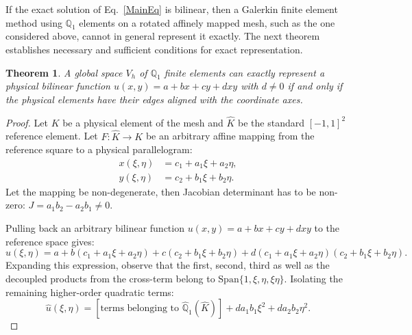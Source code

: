 \documentclass[a4paper]{article}
\theoremstyle{plain}
\newtheorem{theorem}[lemma]{Theorem}
\theoremstyle{definition}
\theoremstyle{remark}
\begin{document}
If the exact solution of Eq.~\eqref{MainEq} is bilinear, then a Galerkin finite element method using \(\mathbb Q_1\) elements on a rotated affinely mapped mesh, such as the one considered above, cannot in general represent it exactly. The next theorem establishes necessary and sufficient conditions for exact representation.

\begin{theorem}\label{thm:exactrep}
	A global space $V_h$ of $\mathbb{Q}_1$ finite elements can exactly represent a physical bilinear function $u(x,y) = a+ bx+ cy+  dxy$ with $d\neq 0$ if and only if the physical elements have their edges aligned with the coordinate axes.
\end{theorem}

\begin{proof}
Let $K$ be a physical element of the mesh and $\hat{K}$ be the standard $[-1,1]^2$ reference element. Let $F: \hat{K} \to K$ be an arbitrary affine mapping from the reference square to a physical parallelogram:
\begin{align*}
x(\xi, \eta) &= c_1 + a_1\xi + a_2\eta, \\
y(\xi, \eta) &= c_2 + b_1\xi + b_2\eta.
\end{align*}
Let the mapping be non-degenerate, then Jacobian determinant has to be non-zero: $J = a_1b_2 - a_2b_1 \neq 0$.
	
Pulling back an arbitrary bilinear function $u(x,y) = a + bx + cy + dxy$ to the reference space gives:
\begin{equation}
\hat{u}(\xi, \eta) = a + b(c_1 + a_1\xi + a_2\eta) + c(c_2 + b_1\xi + b_2\eta) + d(c_1 + a_1\xi + a_2\eta)(c_2 + b_1\xi + b_2\eta).\label{eq:expansion}
\end{equation}
Expanding this expression, observe that the first, second, third as well as the decoupled products from the cross-term belong to $\text{Span}\{1, \xi, \eta, \xi\eta\}$. Isolating the remaining higher-order quadratic terms:
\begin{equation}
\hat{u}(\xi, \eta) = [\text{terms belonging to } \hat{\mathbb{Q}}_1(\hat{K})] + da_1b_1\xi^2 + da_2b_2\eta^2.	\label{eq:terms}
\end{equation}
	

\end{proof}
\end{document}

